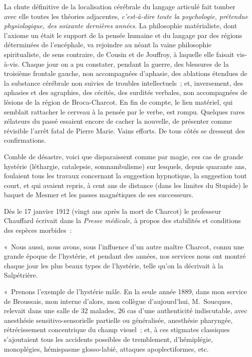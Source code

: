 \documentclass[french,twoside]{book} %
\begin{document}
La chute définitive de la localisation cérébrale du langage articulé fait tomber avec elle toutes les théories adjacentes, {\itshape c’est-à-dire toute la psychologie, prétendue physiologique, des soixante dernières années}. La philosophie matérialiste, dont l’axiome un était le support de la pensée humaine et du langage par des régions déterminées de l’encéphale, va rejoindre au néant la vaine philosophie spiritualiste, de sens contraire, de Cousin et de Jouffroy, à laquelle elle faisait vis-à-vis. Chaque jour on a pu constater, pendant la guerre, des blessures de la troisième frontale gauche, non accompagnées d’aphasie, des ablations étendues de la substance cérébrale non suivies de troubles intellectuels ; et, inversement, des aphasies et des agraphies, des cécités, des surdités verbales, non accompagnées de lésions de la région de Broca-Charcot. En fin de compte, le lien matériel, qui semblait rattacher le cerveau à la pensée par le verbe, est rompu. Quelques rares zélateurs du passé essaient encore de cacher la nouvelle, de présenter comme révisible l’arrêt fatal de Pierre Marie. Vains efforts. De tous côtés se dressent des confirmations.\par
Comble de désastre, voici que disparaissent comme par magie, ces cas de grande hystérie (léthargie, catalepsie, somnambulisme) sur lesquels, depuis quarante ans, foulaient tous les travaux concernant la suggestion hypnotique, la suggestion tout court, et qui avaient repris, à cent ans de distance (dans les limites du Stupide) le baquet de Mesmer et les passes magnétiques de ses successeurs.\par
Dès le 17 janvier 1912 (vingt ans après la mort de Charcot) le professeur Chauffard écrivait dans la {\itshape Presse médicale}, à propos des stabilités et conditions des espèces morbides :\par
« Nous aussi, nous avons, sous l’influence d’un autre maître Charcot, connu une grande époque de l’hystérie, et pendant des années, nos services nous ont montré chaque jour les plus beaux types de l’hystérie, telle qu’on la décrivait à la Salpétrière.\par
« Prenons l’exemple de l’hystérie mâle. En la seule année 1889, dans mon service de Broussais, mon interne d’alors, mon collègue d’aujourd’hui, M. Soucques, relevait dans une salle de 32 malades, 26 cas d’une authenticité indiscutable, avec anesthésie sensitivo-sensorielle partielle ou généralisée, anesthésie pharyngée, rétrécissement concentrique du champ visuel ; et, à ces stigmates classiques s’ajoutaient tous les accidents possibles de tremblement, d’hémiplégie, monoplégies, hémispasme glosso-labié, attaques apoplectiformes, etc.\par
\end{document}
